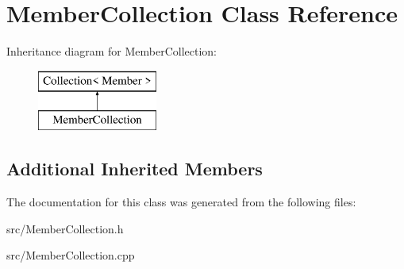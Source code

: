 \hypertarget{class_member_collection}{}\section{Member\+Collection Class Reference}
\label{class_member_collection}
Inheritance diagram for Member\+Collection\+:\begin{figure}[H]
\begin{center}
\leavevmode
\includegraphics[height=2.000000cm]{class_member_collection}
\end{center}
\end{figure}
\subsection*{Additional Inherited Members}


The documentation for this class was generated from the following files\+:\begin{DoxyCompactItemize}
\item 
src/Member\+Collection.\+h\item 
src/Member\+Collection.\+cpp\end{DoxyCompactItemize}
